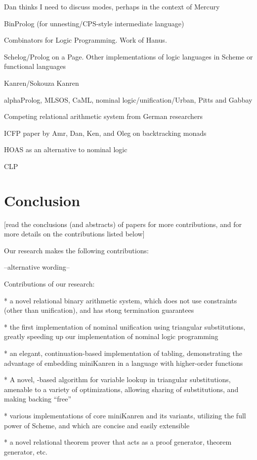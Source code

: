 Dan thinks I need to discuss modes, perhaps in the context of Mercury

BinProlog (for unnesting/CPS-style intermediate language)

Combinators for Logic Programming.  Work of Hanus.

Schelog/Prolog on a Page.  Other implementations of logic languages in
Scheme or functional languages

Kanren/Sokouza Kanren

alphaProlog, MLSOS, CaML, nominal logic/unification/Urban, Pitts and
Gabbay

Competing relational arithmetic system from German researchers

ICFP paper by Amr, Dan, Ken, and Oleg on backtracking monads

HOAS as an alternative to nominal logic

CLP

\chapter{Conclusion} 
[read the conclusions (and abstracts) of papers for more
contributions, and for more details on the contributions listed below]

Our research makes the following contributions:

--alternative wording--

Contributions of our research:

* a novel relational binary arithmetic system, which does not use
constraints (other than unification), and has stong termination
guarantees

* the first implementation of nominal unification using triangular
substitutions, greatly speeding up our implementation of nominal logic
programming

* an elegant, continuation-based implementation of tabling,
demonstrating the advantage of embedding miniKanren in a language with
higher-order functions

* A novel, -based algorithm for variable lookup in
triangular substitutions, amenable to a variety of optimizations,
allowing sharing of substitutions, and making backing ``free''

* various implementations of core miniKanren and its variants,
utilizing the full power of Scheme, and which are concise and easily
extensible

* a novel relational theorem prover that acts as a proof generator,
theorem generator, etc.


